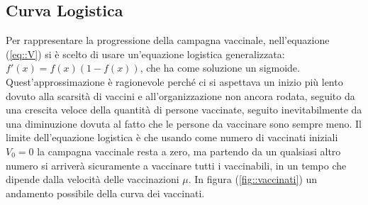 \documentclass{article}
\begin{document}
 \subsection{Curva Logistica}
Per rappresentare la progressione della campagna vaccinale, 
nell'equazione (\ref{eq::V}) si è scelto di usare un'equazione 
logistica generalizzata: $f'(x)=f(x)(1-f(x))$,
che ha come soluzione un sigmoide. Quest'approssimazione è 
ragionevole perché ci si aspettava un inizio più lento dovuto alla 
scarsità di vaccini e all'organizzazione non ancora rodata, 
seguito da una crescita veloce della quantità di persone vaccinate, 
seguito inevitabilmente da una diminuzione dovuta al fatto che le 
persone da vaccinare sono sempre meno. 
Il limite dell'equazione logistica è che usando come numero di 
vaccinati iniziali $V_0  = 0$ la campagna vaccinale resta a zero, 
ma partendo da un qualsiasi altro numero si arriverà sicuramente a 
vaccinare tutti i vaccinabili, in un tempo che dipende dalla velocità 
delle vaccinazioni $\mu$. In figura (\ref{fig::vaccinati}) un 
andamento possibile della curva dei vaccinati.\\
\end{document}
